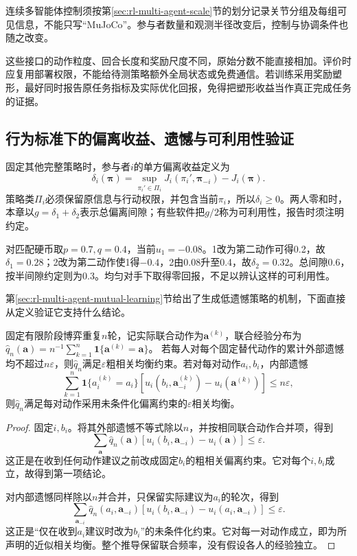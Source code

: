 连续多智能体控制须按第\ref{sec:rl-multi-agent-scale}节的划分记录关节分组及每组可见信息，不能只写“MuJoCo”。参与者数量和观测半径改变后，控制与协调条件也随之改变。

这些接口的动作粒度、回合长度和奖励尺度不同，原始分数不能直接相加。评价时应复用部署权限，不能给待测策略额外全局状态或免费通信。若训练采用奖励塑形，最好同时报告原任务指标及实际优化回报，免得把塑形收益当作真正完成任务的证据。

\subsection{行为标准下的偏离收益、遗憾与可利用性验证}
\label{sec:rl-multi-agent-deviations}

固定其他完整策略时，参与者$i$的单方偏离收益定义为
\[
 \delta_i(\bm\pi)=
 \sup_{\pi_i'\in\Pi_i}J_i(\pi_i',\bm\pi_{-i})-J_i(\bm\pi).
\]
策略类$\Pi_i$必须保留原信息与行动权限，并包含当前$\pi_i$，所以$\delta_i\geq0$。两人零和时，本章以$g=\delta_1+\delta_2$表示总偏离间隙；有些软件把$g/2$称为可利用性，报告时须注明约定。

对匹配硬币取$p=0.7,q=0.4$，当前$u_1=-0.08$。1改为第二动作可得0.2，故$\delta_1=0.28$；2改为第二动作使1得$-0.4$，2由0.08升至0.4，故$\delta_2=0.32$。总间隙0.6，按半间隙约定则为0.3。均匀对手下取得零回报，不足以辨认这样的可利用性。

第\ref{sec:rl-multi-agent-mutual-learning}节给出了生成低遗憾策略的机制，下面直接从定义验证它支持什么结论。

\begin{theorem}[阶段遗憾与联合经验分布]
\label{thm:rl-multi-agent-regret-ce}
固定有限阶段博弈重复$n$轮，记实际联合动作为$\bm a^{(k)}$，联合经验分布为
$\hat q_n(\bm a)=n^{-1}\sum_{k=1}^n\mathbf1\{\bm a^{(k)}=\bm a\}$。
若每人对每个固定替代动作的累计外部遗憾均不超过$n\varepsilon$，则$\hat q_n$满足$\varepsilon$粗相关均衡约束。若对每对动作$a_i,b_i$，内部遗憾
\[
 \sum_{k=1}^n\mathbf1\{a_i^{(k)}=a_i\}
 [u_i(b_i,\bm a_{-i}^{(k)})-u_i(\bm a^{(k)})]
 \leq n\varepsilon,
\]
则$\hat q_n$满足每对动作采用未条件化偏离约束的$\varepsilon$相关均衡。
\end{theorem}
\begin{proof}
固定$i,b_i$。将其外部遗憾不等式除以$n$，并按相同联合动作合并项，得到
\[
 \sum_{\bm a}\hat q_n(\bm a)
 [u_i(b_i,\bm a_{-i})-u_i(\bm a)]\leq\varepsilon.
\]
这正是在收到任何动作建议之前改成固定$b_i$的粗相关偏离约束。它对每个$i,b_i$成立，故得到第一项结论。

对内部遗憾同样除以$n$并合并，只保留实际建议为$a_i$的轮次，得到
\[
 \sum_{\bm a_{-i}}\hat q_n(a_i,\bm a_{-i})
 [u_i(b_i,\bm a_{-i})-u_i(a_i,\bm a_{-i})]\leq\varepsilon.
\]
这正是“仅在收到$a_i$建议时改为$b_i$”的未条件化约束。它对每一对动作成立，即为所声明的近似相关均衡。整个推导保留联合频率，没有假设各人的经验独立。
\end{proof}

